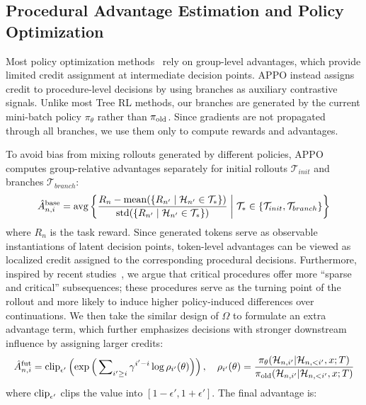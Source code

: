 \documentclass{article}
\begin{document}
\subsection{Procedural Advantage Estimation and Policy Optimization}

Most policy optimization methods~\cite{ji2025tree,xin2025bfs} rely on group-level advantages, which provide limited credit assignment at intermediate decision points. APPO instead assigns credit to procedure-level decisions by using branches as auxiliary contrastive signals. Unlike most Tree RL methods, our branches are generated by the current mini-batch policy $\pi_\theta$ rather than $\pi_{\rm old}$. Since gradients are not propagated through all branches, we use them only to compute rewards and advantages.

To avoid bias from mixing rollouts generated by different policies, APPO computes group-relative advantages separately for initial rollouts $\mathcal{T}_{init}$ and branches $\mathcal{T}_{branch}$:
\begin{equation}\label{eq:dual}
    \hat{A}^{\rm base}_{n,i} = {\rm avg}\left\{
    \frac{R_n - {\rm mean}(\{R_{n'} \mid \mathcal{H}_{n'} \in \mathcal{T}_*\})}
    {{\rm std}(\{R_{n'} \mid \mathcal{H}_{n'} \in \mathcal{T}_*\})}
    \;\middle|\;
    \mathcal{T}_* \in \{\mathcal{T}_{init}, \mathcal{T}_{branch}\}
    \right\}
\end{equation}
where $R_n$ is the task reward. Since generated tokens serve as observable instantiations of latent decision points, token-level advantages can be viewed as localized credit assigned to the corresponding procedural decisions. Furthermore, inspired by recent studies~\cite{huang2026direction,meng2026sparse}, we argue that critical procedures offer more ``sparse and critical'' subsequences; these procedures serve as the turning point of the rollout and more likely to induce higher policy-induced differences over continuations. We then take the similar design of $\Omega$ to formulate an extra advantage term, which further emphasizes decisions with stronger downstream influence by assigning larger credits:
\begin{equation}\label{eq:fut}
    \hat{A}^{\rm fut}_{n,i} = {\rm clip}_{\epsilon'}\left(
    \exp\Big(\sum\nolimits_{i'\ge i}\gamma^{i'-i}\log \rho_{i'}(\theta)\Big)
    \right), \quad 
    \rho_{i'}(\theta)=\frac{\pi_\theta(\mathcal{H}_{n,i'}|\mathcal{H}_{n,<i'}, {x};T)}
    {\pi_{\rm old}(\mathcal{H}_{n,i'}|\mathcal{H}_{n,<i'}, {x};T)}
\end{equation}
where ${\rm clip}_{\epsilon'}$ clips the value into $[1-\epsilon', 1+\epsilon']$. The final advantage is:
\end{document}
